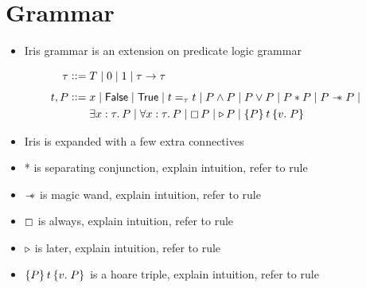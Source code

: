 \documentclass[thesis.tex]{subfiles}
\begin{document}
\section{Grammar}
\begin{itemize}
  \item Iris grammar is an extension on predicate logic grammar
\end{itemize}
\begin{align*}
  \type \bnfdef{}        & \sigtype \mid 0 \mid 1 \mid \type \to \type                                                                                                      \\[0.4em]
  \term, \prop \bnfdef{} & \var \mid \FALSE \mid \TRUE \mid \term =_\type \term \mid \prop \land \prop \mid \prop \lor \prop \mid \prop * \prop \mid \prop \wand \prop \mid \\
                         & \Exists \var:\type. \prop \mid \All \var:\type. \prop \mid \always\prop \mid {\later\prop} \mid \hoare{\prop}{\term}{v.\; \prop}                 \\
\end{align*}
\begin{itemize}
  \item Iris is expanded with a few extra connectives
  \item * is separating conjunction, explain intuition, refer to rule
  \item $\mathrel{-\!\!\ast}$ is magic wand, explain intuition, refer to rule
  \item $\mathop{\boxempty}$ is always, explain intuition, refer to rule
  \item $\mathop{{\triangleright}}$ is later, explain intuition, refer to rule
  \item $\hoare{\prop}{\term}{v.\; \prop}$ is a hoare triple, explain intuition, refer to rule
\end{itemize}
\end{document}

